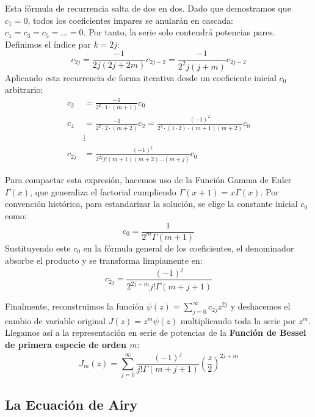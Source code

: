 Esta fórmula de recurrencia salta de dos en dos. Dado que demostramos que $c_1 = 0$, todos los coeficientes impares se anularán en cascada: $c_1 = c_3 = c_5 = \dots = 0$. 
Por tanto, la serie solo contendrá potencias pares. Definimos el índice par $k = 2j$:
\[
    c_{2j} = \frac{-1}{2j(2j + 2m)} c_{2j-2} = \frac{-1}{2^2 j (j + m)} c_{2j-2}
\]
Aplicando esta recurrencia de forma iterativa desde un coeficiente inicial $c_0$ arbitrario:
\begin{align*}
    c_2 &= \frac{-1}{2^2 \cdot 1 \cdot (m+1)} c_0 \\
    c_4 &= \frac{-1}{2^2 \cdot 2 \cdot (m+2)} c_2 = \frac{(-1)^2}{2^4 \cdot (1\cdot 2) \cdot (m+1)(m+2)} c_0 \\
    &\vdots \\
    c_{2j} &= \frac{(-1)^j}{2^{2j} j! (m+1)(m+2)\dots(m+j)} c_0
\end{align*}

Para compactar esta expresión, hacemos uso de la Función Gamma de Euler $\Gamma(x)$, que generaliza el factorial cumpliendo $\Gamma(x+1) = x\Gamma(x)$. Por convención histórica, para estandarizar la solución, se elige la constante inicial $c_0$ como:
\[
    c_0 = \frac{1}{2^m \Gamma(m+1)}
\]
Sustituyendo este $c_0$ en la fórmula general de los coeficientes, el denominador absorbe el producto y se transforma limpiamente en:
\[
    c_{2j} = \frac{(-1)^j}{2^{2j+m} j! \Gamma(m+j+1)}
\]

Finalmente, reconstruimos la función $\psi(z) = \sum_{j=0}^{\infty} c_{2j} z^{2j}$ y deshacemos el cambio de variable original $J(z) = z^m \psi(z)$ multiplicando toda la serie por $z^m$. Llegamos así a la representación en serie de potencias de la \textbf{Función de Bessel de primera especie de orden $m$}:
\[
    J_m(z) = \sum_{j=0}^{\infty} \frac{(-1)^j}{j! \Gamma(m+j+1)} \left( \frac{z}{2} \right)^{2j+m}
\]

\subsection{La Ecuación de Airy}

